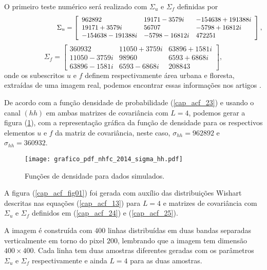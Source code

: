 O primeiro teste numérico será realizado com $\Sigma_u$ e $\Sigma_f$ definidas por
\begin{equation}\label{matriz_sigma_nhfc_1}
	\hspace{2.75cm} \Sigma_{u}= \left[
\begin{array}{lll}
	962892             &19171 - 3579i&     -154638 + 191388i \\
	19171 + 3579i      &56707        &     -5798 + 16812i  \\
	-154638 - 191388i  &-5798 - 16812i&      472251 
\end{array}
\right],
\end{equation}
\begin{equation}\label{matriz_sigma_nhfc_2}
 \Sigma_{f}= \left[
\begin{array}{lll}
	360932            & 11050 + 3759i&   63896 + 1581i \\
	11050 - 3759i     & 98960       &   6593 + 6868i \\
	63896  - 1581i    & 6593  - 6868i&   208843
\end{array}
\right],
\end{equation}
onde os subescritos $u$ e $f$ definem respectivamente área urbana e floresta, extraídas de uma imagem real, podemos encontrar essas informações nos artigos \citep{fbgm, nhfc}.

De acordo com a função densidade de probabilidade (\ref{cap_acf_23}) e usando o canal $(hh)$ em ambas matrizes de covariância com $L=4$, podemos gerar a figura (\ref{cap_acf_fig02}), com a representação gráfica da função de densidade para os respectivos elementos $u$ e $f$ da matriz de covariância, neste caso, $\sigma_{hh}=962892$ e $\sigma_{hh}= 360932$. 

\begin{figure}[hbt]
	\centering
  \texttt{[image: grafico\_pdf\_nhfc\_2014\_sigma\_hh.pdf]}
	\caption{Funções de densidade para dados simulados.}\label{cap_acf_fig02}
\end{figure}

A figura (\ref{cap_acf_fig01}) foi gerada com auxílio das distribuições Wishart descritas nas equações (\ref{cap_acf_13}) para $L=4$ e matrizes de covariância com $\Sigma_{u}$ e $\Sigma_{f}$ definidos em (\ref{cap_acf_24}) e (\ref{cap_acf_25}).

	
A imagem é construída com $400$ linhas distribuídas em duas bandas separadas verticalmente em torno do pixel $200$, lembrando que a imagem tem dimensão $400 \times 400$. Cada linha  tem duas amostras diferentes geradas com os parâmetros $\Sigma_{u}$ e $\Sigma_{f}$ respectivamente e ainda $L=4$ para as duas amostras.  

